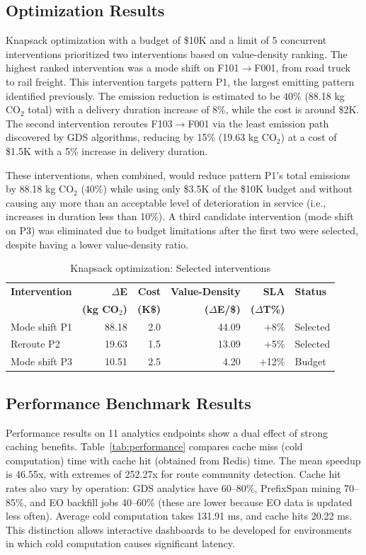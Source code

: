 \documentclass[conference]{IEEEtran}
\begin{document}
\subsection{Optimization Results}
Knapsack optimization with a budget of \$10K and a limit of 5 concurrent interventions prioritized two interventions based on value-density ranking. The highest ranked intervention was a mode shift on F101$\to$F001, from road truck to rail freight. This intervention targets pattern P1, the largest emitting pattern identified previously. The emission reduction is estimated to be 40\% (88.18 kg CO$_2$ total) with a delivery duration increase of 8\%, while the cost is around \$2K. The second intervention reroutes F103$\to$F001 via the least emission path discovered by GDS algorithms, reducing by 15\% (19.63 kg CO$_2$) at a cost of \$1.5K with a 5\% increase in delivery duration.

These interventions, when combined, would reduce pattern P1's total emissions by 88.18 kg CO$_2$ (40\%) while using only \$3.5K of the \$10K budget and without causing any more than an acceptable level of deterioration in service (i.e., increases in duration less than 10\%). A third candidate intervention (mode shift on P3) was eliminated due to budget limitations after the first two were selected, despite having a lower value-density ratio.

\begin{table}[!b]
\centering
\caption{Knapsack optimization: Selected interventions}
\footnotesize
\begin{tabular}{@{}lrrrrl@{}}
\toprule
\textbf{Intervention} & \textbf{$\Delta$E} & \textbf{Cost} & \textbf{Value-Density} & \textbf{SLA} & \textbf{Status} \\
& \textbf{(kg CO$_2$)} & \textbf{(K\$)} & \textbf{($\Delta$E/\$)} & \textbf{($\Delta$T\%)} & \\
\midrule
Mode shift P1 & 88.18 & 2.0 & 44.09 & +8\% & Selected \\
Reroute P2 & 19.63 & 1.5 & 13.09 & +5\% & Selected \\
Mode shift P3 & 10.51 & 2.5 & 4.20 & +12\% & Budget \\
\bottomrule
\end{tabular}
\label{tab:knapsack}
\end{table}

\subsection{Performance Benchmark Results}
Performance results on 11 analytics endpoints show a dual effect of strong caching benefits. Table~\ref{tab:performance} compares cache miss (cold computation) time with cache hit (obtained from Redis) time. The mean speedup is 46.55x, with extremes of 252.27x for route community detection. Cache hit rates also vary by operation: GDS analytics have 60--80\%, PrefixSpan mining 70--85\%, and EO backfill jobs 40--60\% (these are lower because EO data is updated less often). Average cold computation takes 131.91 ms, and cache hits 20.22 ms. This distinction allows interactive dashboards to be developed for environments in which cold computation causes significant latency.
\end{document}
